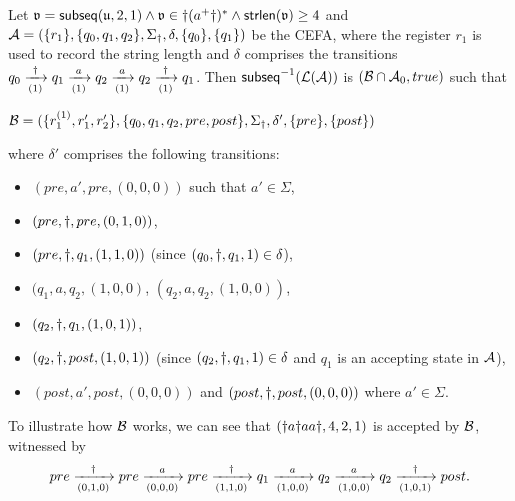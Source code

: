 \begin{example}
Let $\mathfrak{v} = {\sf subseq}(\mathfrak{u}, 2, 1) \wedge \mathfrak{v} \in \dag (a^+ \dag)^* \wedge \mathsf{strlen}(\mathfrak{v}) \ge 4$ and $\mathcal{A} = (\{r_1\}, \{q_0, q_1, q_2\}, \Sigma_{\dag}, \delta, \{q_0\}, \{q_1\})$ be the CEFA, where the register $r_1$ is used to record the string length and $\delta$ comprises the transitions $q_0 \xrightarrow[(1)]{\dag} q_1 \xrightarrow[(1)]{a}q_2 \xrightarrow[(1)]{a} q_2 \xrightarrow[(1)]{\dag} q_1$. 
Then ${\sf subseq}^{-1}(\mathcal{L}(\mathcal{A}))$ is $(\mathcal{B} \cap \mathcal{A}_0, true)$ such that 
\begin{center}
    $\mathcal{B} = (\{r^{(1)}_1, r'_1, r'_2\}, \{q_0, q_1, q_2, pre, post\}, \Sigma_{\dag}, \delta', \{pre\}, \{post\})$
\end{center}
where 
$\delta' $ comprises the following transitions: 
\begin{itemize}[topsep=0pt,partopsep=0pt]
\item $(pre, a', pre, (0, 0,0))$ such that $a' \in \Sigma$, 
%
\item $(pre, \dag, pre, (0, 1,0))$,
%
\item $(pre, \dag, q_1, (1, 1,0))$ (since $(q_0, \dag, q_1, 1) \in \delta$), 
%
\item $(q_1, a, q_2, (1, 0, 0)$, $(q_2, a, q_2, (1, 0, 0))$, 
%
\item $(q_2, \dag, q_1, (1, 0, 1))$, 
%
\item $(q_2, \dag, post, (1, 0, 1))$ (since $(q_2, \dag, q_1, 1) \in \delta$ and $q_1$ is an accepting state in $\mathcal{A}$), 
%
\item $(post, a', post, (0, 0,0))$ and $(post, \dag, post, (0, 0,0))$ where $a' \in \Sigma$.
\end{itemize}
To illustrate how $\mathcal{B}$ works, we can see that $(\dag a  \dag a a \dag, 4, 2, 1)$ is accepted by $\mathcal{B}$, witnessed by %
$$
pre \xrightarrow[(0, 1, 0)]{\dag} pre \xrightarrow[(0, 0, 0)]{a} pre \xrightarrow[(1, 1, 0)]{\dag} q_1 \xrightarrow[(1, 0, 0)]{a} q_2 \xrightarrow[(1, 0, 0)]{a} q_2  \xrightarrow[(1, 0, 1)]{\dag} post.  
$$
\end{example}
